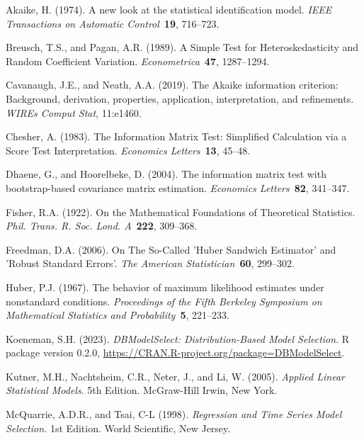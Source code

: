 \documentclass[12pt]{article} %
\theoremstyle{definition}
\begin{document}
\begin{thebibliography}{}

Akaike, H. (1974).
 A new look at the statistical identification model.
{\em IEEE Transactions on Automatic Control}~{\bf 19}, 716--723.

Breusch, T.S., and Pagan, A.R. (1989).
 A Simple Test for Heteroskedasticity and Random Coefficient Variation.
{\em Econometrica}~{\bf 47}, 1287--1294.

Cavanaugh, J.E., and Neath, A.A. (2019).
 The Akaike information criterion: Background, derivation, properties, application, interpretation, and refinements.
{\em WIREs Comput Stat}, 11:e1460.

Chesher, A. (1983).
 The Information Matrix Test: Simplified Calculation via a Score Test Interpretation.
{\em Economics Letters}~{\bf 13}, 45--48.

Dhaene, G., and Hoorelbeke, D. (2004).
 The information matrix test with bootstrap-based covariance matrix estimation.
{\em Economics Letters}~{\bf 82}, 341--347.

Fisher, R.A. (1922).
 On the Mathematical Foundations of Theoretical Statistics.
{\em Phil. Trans. R. Soc. Lond. A}~{\bf 222}, 309--368.

Freedman, D.A. (2006).
 On The So-Called 'Huber Sandwich Estimator' and 'Robust Standard Errors'.
{\em The American Statistician}~{\bf 60}, 299--302.

Huber, P.J. (1967).
 The behavior of maximum likelihood estimates under nonstandard conditions.
{\em Proceedings of the Fifth Berkeley Symposium on Mathematical Statistics and Probability}~{\bf 5}, 221--233.

Koeneman, S.H. (2023).
 {\em DBModelSelect: Distribution-Based Model Selection}.
R package version 0.2.0, \url{https://CRAN.R-project.org/package=DBModelSelect}.

Kutner, M.H., Nachtsheim, C.R., Neter, J., and Li, W. (2005).
 {\em Applied Linear Statistical Models}.
5th Edition. McGraw-Hill Irwin, New York.

McQuarrie, A.D.R., and Tsai, C-L (1998).
 {\em Regression and Time Series Model Selection.}
1st Edition. World Scientific, New Jersey.


\end{thebibliography}
\end{document}
